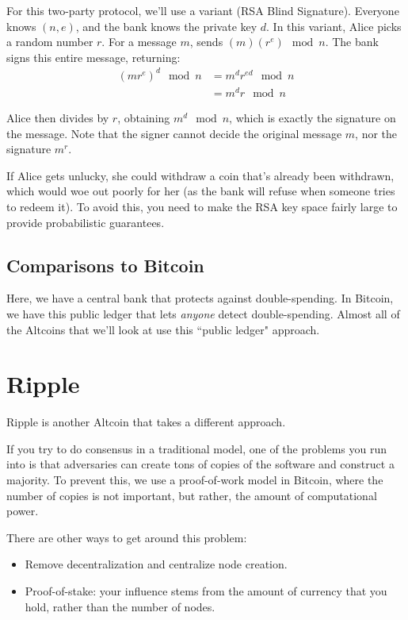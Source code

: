 \documentclass[12pt]{article}
\begin{document}
For this two-party protocol, we'll use a variant (RSA Blind Signature). Everyone knows $(n, e)$, and the bank knows the private key $d$. In this variant, Alice picks a random number $r$. For a message $m$, sends $(m)(r^e) \mod n$. The bank signs this entire message, returning:
\begin{align*}
(mr^e)^d \mod{n} &= m^d r^{ed} \mod{n}\\
&= m^d r\mod{n}
\end{align*}

Alice then divides by $r$, obtaining $m^d \mod{n}$, which is exactly the signature on the message. Note that the signer cannot decide the original message $m$, nor the signature $m^r$.

If Alice gets unlucky, she could withdraw a coin that's already been withdrawn, which would woe out poorly for her (as the bank will refuse when someone tries to redeem it). To avoid this, you need to make the RSA key space fairly large to provide probabilistic guarantees.

\subsection*{Comparisons to Bitcoin}

Here, we have a central bank that protects against double-spending. In Bitcoin, we have this public ledger that lets \textit{anyone} detect double-spending. Almost all of the Altcoins that we'll look at use this ``public ledger" approach.

\section*{Ripple}

Ripple is another Altcoin that takes a different approach.

If you try to do consensus in a traditional model, one of the problems you run into is that adversaries can create tons of copies of the software and construct a majority. To prevent this, we use a proof-of-work model in Bitcoin, where the number of copies is not important, but rather, the amount of computational power.

There are other ways to get around this problem:
\begin{itemize}
\item Remove decentralization and centralize node creation.
\item Proof-of-stake: your influence stems from the amount of currency that you hold, rather than the number of nodes.
\end{itemize}
\end{document}
